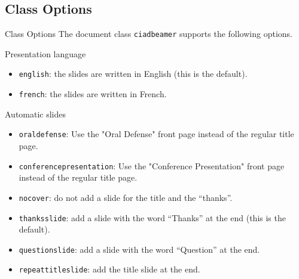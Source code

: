 \documentclass[english,sectioncirclenumberstyle]{ciadbeamer}
\begin{document}
\subsection{Class Options}

\begin{frame}[t]{Class Options}
	The document class \texttt{ciadbeamer} supports the following options.
	\begin{block}{Presentation language}
		\begin{itemize}
		\item \texttt{english}: the slides are written in English (this is the default).
		\item \texttt{french}: the slides are written in French.
		\end{itemize}
	\end{block}
	\begin{block}{Automatic slides}
		\begin{itemize}
		\item \texttt{oraldefense}: Use the "Oral Defense" front page instead of the regular title page.
		\item \texttt{conferencepresentation}: Use the "Conference Presentation" front page instead of the regular title page.
		\item \texttt{nocover}: do not add a slide for the title and the ``thanks''.
		\item \texttt{thanksslide}: add a slide with the word ``Thanks'' at the end (this is the default). 
		\item \texttt{questionslide}: add a slide with the word ``Question'' at the end. 
		\item \texttt{repeattitleslide}: add the title slide at the end.
		\end{itemize}
	\end{block}
\end{frame}
\end{document}

